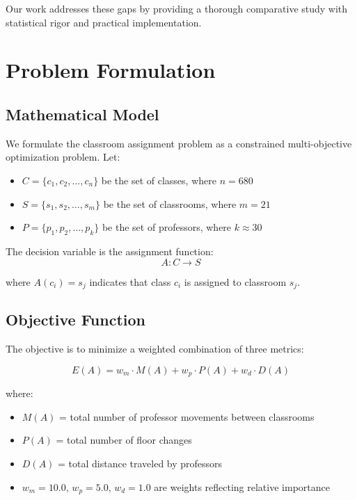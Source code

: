\documentclass[algorithms,article,submit,pdftex,moreauthors]{Definitions/mdpi}
\begin{document}
Our work addresses these gaps by providing a thorough comparative study with statistical rigor and practical implementation.

\section{Problem Formulation}

\subsection{Mathematical Model}

We formulate the classroom assignment problem as a constrained multi-objective optimization problem. Let:

\begin{itemize}
\item $C = \{c_1, c_2, \ldots, c_n\}$ be the set of classes, where $n = 680$
\item $S = \{s_1, s_2, \ldots, s_m\}$ be the set of classrooms, where $m = 21$
\item $P = \{p_1, p_2, \ldots, p_k\}$ be the set of professors, where $k \approx 30$
\end{itemize}

The decision variable is the assignment function:
\begin{equation}
A: C \rightarrow S
\end{equation}

where $A(c_i) = s_j$ indicates that class $c_i$ is assigned to classroom $s_j$.

\subsection{Objective Function}

The objective is to minimize a weighted combination of three metrics:

\begin{equation}
E(A) = w_m \cdot M(A) + w_p \cdot P(A) + w_d \cdot D(A)
\label{eq:objective}
\end{equation}

where:
\begin{itemize}
\item $M(A)$ = total number of professor movements between classrooms
\item $P(A)$ = total number of floor changes
\item $D(A)$ = total distance traveled by professors
\item $w_m = 10.0$, $w_p = 5.0$, $w_d = 1.0$ are weights reflecting relative importance
\end{itemize}
\end{document}
